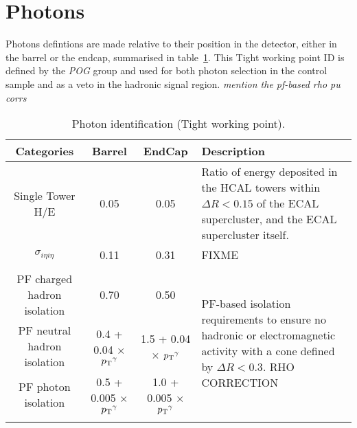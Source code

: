 \section{Photons}  %
\label{sec:objects_photons}

Photons defintions are made relative to their position in the detector, either 
in the barrel or the endcap, summarised in table~\ref{tab:photon-id-egamma}. 
This Tight working point ID is defined by the \emph{POG} group and used for both photon
selection in the \gj control sample and as a veto in the hadronic signal region.
\emph{mention the pf-based rho pu corrs}

\begin{table}[ht!]
  \caption{Photon identification (Tight working point).\label{tab:photon-id-egamma}}
  \centering
  \scriptsize
  \begin{tabular}{ cccp{4cm} }
    \hline
    \hline
    Categories                    & Barrel                             & EndCap 
    & Description                         \\
    \hline
    Single Tower H/E              & 0.05                               & 0.05                               
    & Ratio of energy deposited in the HCAL towers within $\Delta R<0.15$ of the ECAL 
    supercluster, and the ECAL supercluster itself. \\
    $\sigma_{i\eta i\eta}$        & 0.11                               & 0.31 & 
    FIXME \\
    &&&\multirow{5}{4cm}{PF-based isolation requirements to ensure no hadronic or electromagnetic 
    activity with a cone defined by $\Delta R < 0.3$. RHO CORRECTION}\\
    PF charged hadron isolation   & 0.70                               & 0.50                               & \\
    PF neutral hadron isolation   & 0.4 + 0.04 $\times$ ${p_{\text T}}^{\gamma}$  & 1.5 + 0.04 $\times$ ${p_{\text T}}^{\gamma}$&
    \\
    PF photon isolation           & 0.5 + 0.005 $\times$ ${p_{\text T}}^{\gamma}$ & 1.0 + 0.005 $\times$ ${p_{\text T}}^{\gamma}$& \\
    \\
    \hline
    \hline
  \end{tabular}
\end{table}


